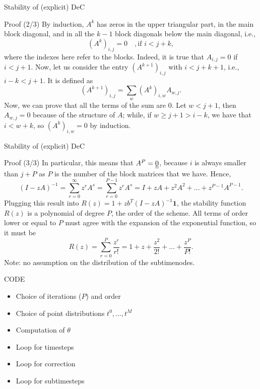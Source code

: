 \documentclass[aspectratio=169]{beamer}
\begin{document}
\begin{frame}{Stability of (explicit) DeC}
		\begin{block}{Proof (2/3)}
	By induction, $A^k$ 
	has zeros in the upper triangular part, in the main block diagonal, and in all the $k-1$ block diagonals below the main diagonal, i.e., $$(A^k)_{i,j} = 0 \quad, \text{if } i< j+k,$$ where the indexes here refer to the blocks.
	Indeed, it is true that $A_{i,j}=0$ if $i<j+1$.
	Now, let us consider the entry $(A^{k+1})_{i,j}$ with $i<j+k+1$, i.e., $i-k<j+1$. It is defined as
	\begin{equation}
		(A^{k+1})_{i,j} = \sum_{w} (A^{k})_{i,w} A_{w,j}.
	\end{equation}
	Now, we can prove that all the terms of the sum are 0. Let $w<j+1$, then $A_{w,j}=0$ because of the structure of $A$; while, if $w\geq j+1 >i-k$, we have that $i<w+k$, so $(A^k)_{i,w} = 0$ by induction. 
\end{block}
\end{frame}


\begin{frame}{Stability of (explicit) DeC}
	\begin{block}{Proof (3/3)}
		In particular, this means that $A^{P}=\underline{\underline{0}}$, because $i$ is always smaller than $j+P$ as $P$ is the number of the block matrices that we have.
		Hence, 
		\begin{equation}
			(I-zA)^{-1}=\sum_{r=0}^{\infty} z^rA^s =\sum_{r=0}^{P-1} z^rA^s = I + zA + z^2A^2+\dots + z^{P-1}A^{P-1}. 
		\end{equation}
		Plugging this result into $R(z) = 1+ z b^T (I-zA)^{-1} \mathbf{1}$,
		the stability function $R(z)$ is a polynomial of degree $P$, the order of the scheme. 
		All terms of order lower or equal to $P$ must agree with the expansion of the exponential function, so it must be
		\begin{equation}
			R(z) = \sum_{r=0}^{P} \frac{z^r}{r!}= 1 + z + \frac{z^2}{2!} +\dots +\frac{z^P}{P!}.
		\end{equation}
		Note: no assumption on the distribution of the subtimenodes.
	\end{block}
\end{frame}

\begin{frame}{CODE}
\begin{itemize}
	\item Choice of iterations ($P$) and order
	\item Choice of point distributions $t^0, \dots, t^M$
	\item Computation of $\theta$
	\item Loop for timesteps
	\item Loop for correction
	\item Loop for subtimesteps
\end{itemize}
\end{frame}
\end{document}
